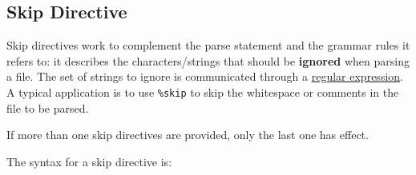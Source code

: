 
\subsection{Skip Directive}
{
	Skip directives work to complement the parse statement and the
	grammar rules it refers to: it describes the characters/strings that
	should be \textbf{ignored} when parsing a file. The set of strings to
	ignore is communicated through a \hyperref[sec:regex]{regular expression}.
	A typical application is to use \texttt{\%skip} to skip the whitespace
	or comments in the file to be parsed.
	
	If more than one skip directives are provided, only
	the last one has effect.
	
	The syntax for a skip directive is:
	\begin{lstlisting}[numbers=none, texcl=true, language=MAIA]
%skip: <regular-expression>;
	\end{lstlisting}
}
